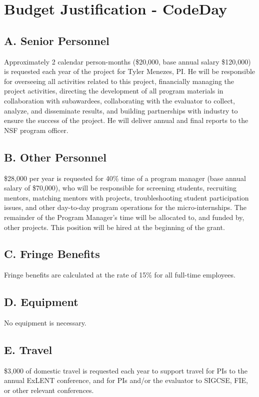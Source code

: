 %
%
\section{Budget Justification - CodeDay}

\subsection{A. Senior Personnel}
Approximately 2 calendar person-months (\$20,000, base annual salary \$120,000) is requested each year of the project for Tyler Menezes, PI. He will be responsible for overseeing all activities related to this project, financially managing the project activities, directing the development of all program materials in collaboration with subawardees, collaborating with the evaluator to collect, analyze, and disseminate results, and building partnerships with industry to ensure the success of the project. He will deliver annual and final reports to the NSF program officer.

\subsection{B. Other Personnel}
\$28,000 per year is requested for 40\% time of a program manager (base annual salary of \$70,000), who will be responsible for screening students, recruiting mentors, matching mentors with projects, troubleshooting student participation issues, and other day-to-day program operations for the micro-internships. The remainder of the Program Manager's time will be allocated to, and funded by, other projects. This position will be hired at the beginning of the grant.

\subsection{C. Fringe Benefits}
Fringe benefits are calculated at the rate of 15\% for all full-time employees.

\subsection{D. Equipment}
No equipment is necessary.

\subsection{E. Travel}
\$3,000 of domestic travel is requested each year to support travel for PIs to the annual ExLENT conference, and for PIs and/or the evaluator to SIGCSE, FIE, or other relevant conferences.

